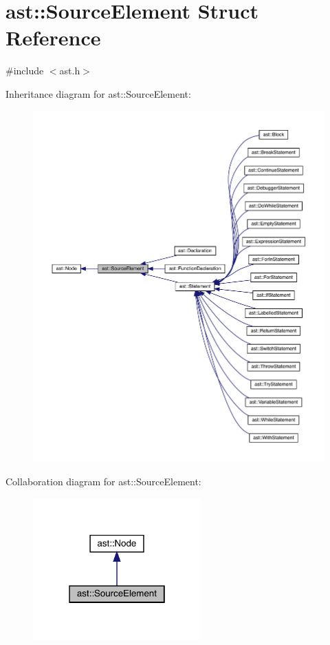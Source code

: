 \hypertarget{structast_1_1_source_element}{}\section{ast\+:\+:Source\+Element Struct Reference}
\label{structast_1_1_source_element}


{\ttfamily \#include $<$ast.\+h$>$}



Inheritance diagram for ast\+:\+:Source\+Element\+:
\nopagebreak
\begin{figure}[H]
\begin{center}
\leavevmode
\includegraphics[width=350pt]{structast_1_1_source_element__inherit__graph}
\end{center}
\end{figure}


Collaboration diagram for ast\+:\+:Source\+Element\+:
\nopagebreak
\begin{figure}[H]
\begin{center}
\leavevmode
\includegraphics[width=183pt]{structast_1_1_source_element__coll__graph}
\end{center}
\end{figure}
